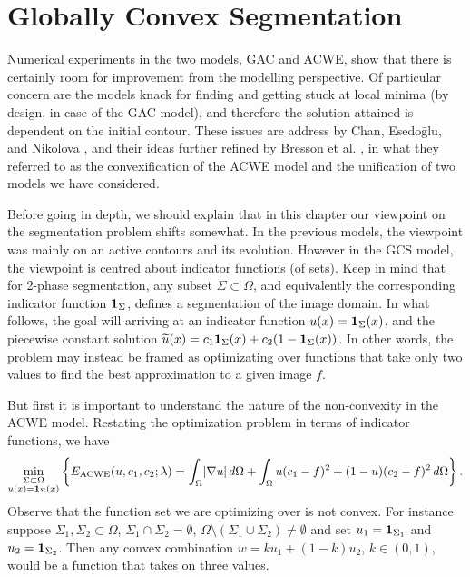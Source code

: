 \chapter{Globally Convex Segmentation}
\label{ch:gcs}
Numerical experiments in the two models, GAC and ACWE, show that there is certainly room for improvement from the modelling perspective. Of particular concern are the models knack for finding and getting stuck at local minima (by design, in case of the GAC model), and therefore the solution attained is dependent on the initial contour. These issues are address by Chan, Esedo\={g}lu, and Nikolova \cite{chan2006algorithms}, and their ideas further refined by Bresson et al. \cite{bresson2007fast}, in what they referred to as the convexification of the ACWE model and the unification of two models we have considered.

Before going in depth, we should explain that in this chapter our viewpoint on the segmentation problem shifts somewhat. In the previous models, the viewpoint was mainly on an active contours and its evolution. However in the GCS model, the viewpoint is centred about indicator functions (of sets). Keep in mind that for 2-phase segmentation, any subset $\Sigma \subset \Omega$, and equivalently the corresponding indicator function $\mathbf{1}_\Sigma$, defines a segmentation of the image domain. In what follows, the goal will arriving at an indicator function $u(x) = \mathbf{1}_\Sigma(x)$, and the piecewise constant solution $\widetilde u(x) = c_1 \mathbf{1}_\Sigma(x) + c_2 (1 - \mathbf{1}_\Sigma(x))$. In other words, the problem may instead be framed as optimizating over functions that take only two values to find the best approximation to a given image $f$.

But first it is important to understand the nature of the non-convexity in the ACWE model. Restating the optimization problem in terms of indicator functions, we have 
\begin{align}
\min_{\substack{\Sigma\subset\Omega \\ 
		u(x) = \mathbf{1}_\Sigma(x)}} 
\left\{E_\textrm{ACWE}(u, c_1, c_2; \lambda)
= \int_{\Omega} \lvert\nabla u\rvert \,d\Omega 
+ \int_\Omega u(c_1 - f)^2   + (1-u)(c_2 - f)^2 \,d\Omega 
\right\}.
\label{eq:eacwe2}
\end{align}
Observe that the function set we are optimizing over is not convex. For instance suppose $\Sigma_1, \Sigma_2 \subset \Omega$, $\Sigma_1 \cap \Sigma_2 = \emptyset$, $\Omega \setminus (\Sigma_1 \cup \Sigma_2) \neq \emptyset$ and set $u_1 = \mathbf{1}_{\Sigma_1}$ and $u_2 = \mathbf{1}_{\Sigma_2}$. Then any convex combination $w = ku_1 + (1-k)u_2$, $k \in (0,1)$, would be a function that takes on three values. 

